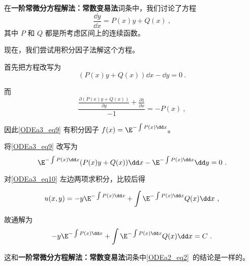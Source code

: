 \begin{example}{}
在\textbf{一阶常微分方程解法：常数变易法}词条中，我们讨论了方程
\begin{equation}
\frac{\dd y}{\dd x}=P(x)y+Q(x)~,
\end{equation}
其中 $P$ 和 $Q$ 都是所考虑区间上的连续函数。

现在，我们尝试用积分因子法解这个方程。

首先把方程改写为
\begin{equation}\label{ODEa3_eq9}
(P(x)y+Q(x))\dd x-\dd y=0~.
\end{equation}

而
\begin{equation}
\frac{\frac{\partial (P(x)y+Q(x))}{\partial y}+\frac{\partial 1}{\partial x}}{-1}=-P(x)~,
\end{equation}

因此\autoref{ODEa3_eq9} 有积分因子 $f(x)=\E^{-\int P(x)\dd x}
$。

将\autoref{ODEa3_eq9} 改写为
\begin{equation}\label{ODEa3_eq10}
\E^{-\int P(x)\dd x}(P(x)y+Q(x))\dd x-\E^{-\int P(x)\dd x}\dd y=0~.
\end{equation}

对\autoref{ODEa3_eq10} 左边两项求积分，比较后得

\begin{equation}
u(x, y)=-y\E^{-\int P(x)\dd x}+\int  \E^{-\int P(x)\dd x}Q(x)  \dd x~,
\end{equation}

故通解为
\begin{equation}
-y\E^{-\int P(x)\dd x}+\int  \E^{-\int P(x)\dd x}Q(x)  \dd x=C~.
\end{equation}

这和\textbf{一阶常微分方程解法：常数变易法}词条中\autoref{ODEa2_eq2}~的结论是一样的。

\end{example}














